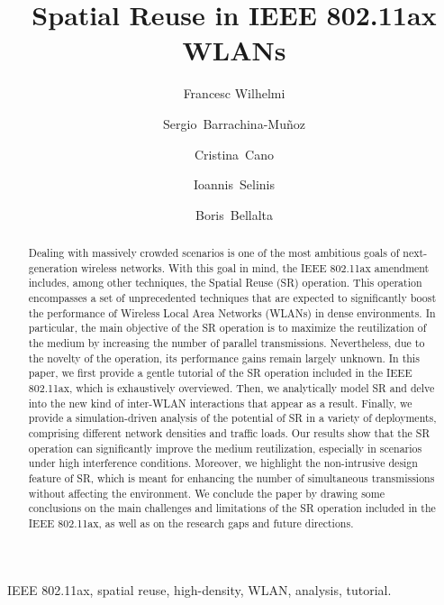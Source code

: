 \documentclass[preprint,12pt]{elsarticle}
\begin{document}
	
	\begin{frontmatter}
	
	\title{Spatial Reuse in IEEE 802.11ax WLANs}
	
	\author[label1]{Francesc Wilhelmi } %
	\author[label1]{Sergio~Barrachina-Mu\~noz}
	\author[label2]{Cristina~Cano}
	\author[label3]{Ioannis~Selinis}
	\author[label1]{Boris~Bellalta}
	\address[label1]{Wireless Networking Research Group (WN-UPF), 08002 Barcelona, Spain}
	\address[label2]{Wireless Networks Research Group (WINE-UOC), 08860 Barcelona, Spain}
	\address[label3]{Institute for Communications Systems (ICS-UoS), GU2 7XH Surrey, United Kingdom}

	\begin{abstract}
		Dealing with massively crowded scenarios is one of the most ambitious goals of next-generation wireless networks. With this goal in mind, the IEEE 802.11ax amendment includes, among other techniques, the Spatial Reuse (SR) operation. This operation encompasses a set of unprecedented techniques that are expected to significantly boost the performance of Wireless Local Area Networks (WLANs) in dense environments. In particular, the main objective of the SR operation is to maximize the reutilization of the medium by increasing the number of parallel transmissions. Nevertheless, due to the novelty of the operation, its performance gains remain largely unknown. In this paper, we first provide a gentle tutorial of the SR operation included in the IEEE 802.11ax, which is exhaustively overviewed. Then, we analytically model SR and delve into the new kind of inter-WLAN interactions that appear as a result. Finally, we provide a simulation-driven analysis of the potential of SR in a variety of deployments, comprising different network densities and traffic loads. Our results show that the SR operation can significantly improve the medium reutilization, especially in scenarios under high interference conditions. Moreover, we highlight the non-intrusive design feature of SR, which is meant for enhancing the number of simultaneous transmissions without affecting the environment. We conclude the paper by drawing some conclusions on the main challenges and limitations of the SR operation included in the IEEE 802.11ax, as well as on the research gaps and future directions.
	\end{abstract}
	
	\begin{keyword}
		IEEE 802.11ax, spatial reuse, high-density, WLAN, analysis, tutorial.	
	\end{keyword}

	\end{frontmatter}
		
\end{document}
